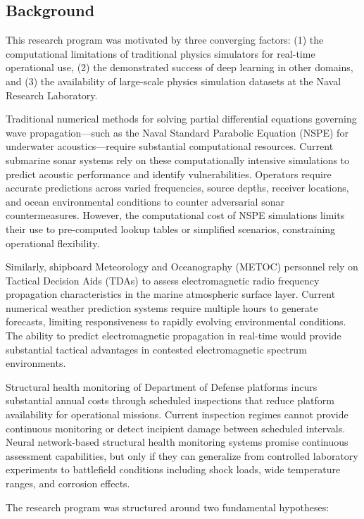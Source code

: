 \documentclass{article}
\begin{document}
\subsection{Background}

This research program was motivated by three converging factors: (1) the computational limitations of traditional physics simulators for real-time operational use, (2) the demonstrated success of deep learning in other domains, and (3) the availability of large-scale physics simulation datasets at the Naval Research Laboratory.

Traditional numerical methods for solving partial differential equations governing wave propagation—such as the Naval Standard Parabolic Equation (NSPE) for underwater acoustics—require substantial computational resources. Current submarine sonar systems rely on these computationally intensive simulations to predict acoustic performance and identify vulnerabilities. Operators require accurate predictions across varied frequencies, source depths, receiver locations, and ocean environmental conditions to counter adversarial sonar countermeasures. However, the computational cost of NSPE simulations limits their use to pre-computed lookup tables or simplified scenarios, constraining operational flexibility.

Similarly, shipboard Meteorology and Oceanography (METOC) personnel rely on Tactical Decision Aids (TDAs) to assess electromagnetic radio frequency propagation characteristics in the marine atmospheric surface layer. Current numerical weather prediction systems require multiple hours to generate forecasts, limiting responsiveness to rapidly evolving environmental conditions. The ability to predict electromagnetic propagation in real-time would provide substantial tactical advantages in contested electromagnetic spectrum environments.

Structural health monitoring of Department of Defense platforms incurs substantial annual costs through scheduled inspections that reduce platform availability for operational missions. Current inspection regimes cannot provide continuous monitoring or detect incipient damage between scheduled intervals. Neural network-based structural health monitoring systems promise continuous assessment capabilities, but only if they can generalize from controlled laboratory experiments to battlefield conditions including shock loads, wide temperature ranges, and corrosion effects.

The research program was structured around two fundamental hypotheses:
\end{document}
